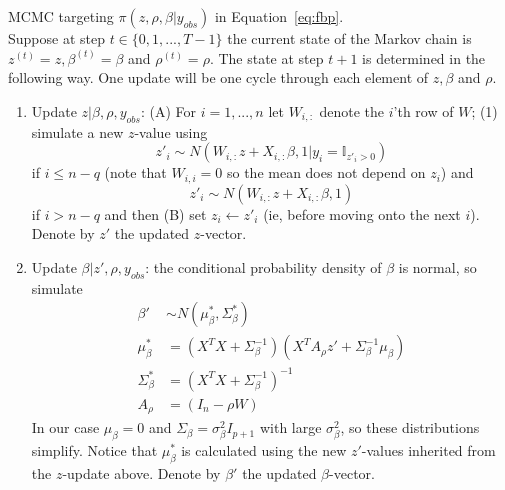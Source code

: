 \documentclass{article}
\begin{document}
\begin{algorithm}
    \vspace*{0.1in}
	MCMC targeting $\pi (z, \rho, \beta | y_{obs} )$ in Equation~\ref{eq:fbp}. \\[0.05in]

    Suppose at step $t\in \{0,1,...,T-1\}$ the current state of the Markov chain is
    $z^{(t)}=z,\beta^{(t)}=\beta$ and $\rho^{(t)}=\rho$. The state at step $t+1$ is determined in the following way.
    One update will be one cycle through each element of $z,\beta$ and $\rho$.
    \begin{enumerate}
    \item Update $z|\beta,\rho,y_{obs}$: (A) For $i=1,...,n$ let $W_{i,:}$ denote the $i$'th row of $W$; (1) simulate a new $z$-value using
    \[
    z'_i\sim N(W_{i,:}z+X_{i,:}\beta,1|y_i = \mathbb{I}_{z'_i > 0})
    \]
    if $i\le n-q$ (note that $W_{i,i}=0$ so the mean does not depend on $z_i$) and
    \[
    z'_i\sim N(W_{i,:}z+X_{i,:}\beta,1)
    \]
    if $i>n-q$ and then (B) set $z_i\leftarrow z'_i$ (ie, before moving onto the next $i$). Denote by
    $z'$ the updated $z$-vector.

	\item Update $\beta|z',\rho,y_{obs}$: the conditional probability density of $\beta$ is normal, so simulate
    \begin{align*}
        \beta' &\sim N(\mu^*_\beta, \Sigma_{\beta}^*) \\
    	\mu_\beta^* &= (X^T X + \Sigma_\beta^{-1})  (X^T A_\rho z' + \Sigma_\beta^{-1} \mu_\beta) \\
    	\Sigma_\beta^* &= (X^T X + \Sigma_\beta^{-1}) ^ {-1} \\
        A_\rho &= (I_n - \rho W)
	\end{align*}
	In our case $\mu_\beta=0$ and $\Sigma_\beta=\sigma^2_\beta I_{p+1}$ with large $\sigma^2_\beta$, so these distributions simplify.
    Notice that $\mu_\beta^*$ is calculated using the new $z'$-values inherited from the $z$-update above.
	Denote by $\beta'$ the updated $\beta$-vector.


\end{enumerate}
\end{algorithm}
\end{document}
